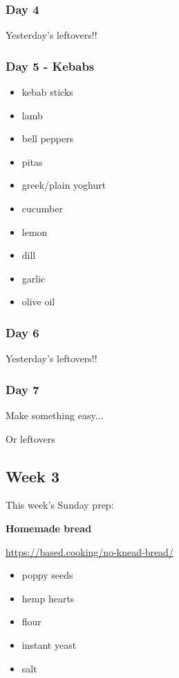 \documentclass[11pt, a4paper]{article}
\begin{document}
\subsubsection{Day 4}
\vspace{1pc}
Yesterday's leftovers!!

\subsubsection{Day 5 - Kebabs}
\vspace{1pc}
\begin{itemize}
\item kebab sticks
\item lamb
\item bell peppers
\item pitas
\item greek/plain yoghurt 
\item cucumber
\item lemon
\item dill
\item garlic
\item olive oil
\end{itemize}

\subsubsection{Day 6}
\vspace{1pc}
Yesterday's leftovers!!

\subsubsection{Day 7}
\vspace{1pc}
\noindent Make something easy...
\par
Or leftovers


\vspace{0.917 pc} %


\pagebreak
\subsection{Week 3}

This week's Sunday prep:
\par
\vspace{1pc}
\noindent\textbf{Homemade bread}
\par
\small{\url{https://based.cooking/no-knead-bread/}}
\begin{itemize}
\item poppy seeds
\item hemp hearts
\item flour
\item instant yeast
\item salt
\end{itemize}
\end{document}
